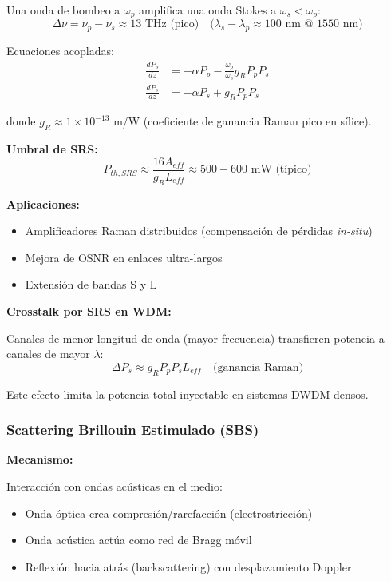 \documentclass[11pt,a4paper]{article}
\begin{document}
Una onda de bombeo a $\omega_p$ amplifica una onda Stokes a $\omega_s < \omega_p$:
\begin{equation}
    \Delta\nu = \nu_p - \nu_s \approx 13 \text{ THz (pico)} \quad (\lambda_s - \lambda_p \approx 100 \text{ nm @ 1550 nm)}
\end{equation}

Ecuaciones acopladas:
\begin{align}
    \frac{dP_p}{dz} &= -\alpha P_p - \frac{\omega_p}{\omega_s}g_R P_p P_s\\
    \frac{dP_s}{dz} &= -\alpha P_s + g_R P_p P_s
\end{align}

donde $g_R \approx 1 \times 10^{-13}$ m/W (coeficiente de ganancia Raman pico en sílice).

\textbf{Umbral de SRS:}
\begin{equation}
    P_{th,SRS} \approx \frac{16 A_{eff}}{g_R L_{eff}} \approx 500-600 \text{ mW (típico)}
\end{equation}

\textbf{Aplicaciones:}
\begin{itemize}
    \item Amplificadores Raman distribuidos (compensación de pérdidas \textit{in-situ})
    \item Mejora de OSNR en enlaces ultra-largos
    \item Extensión de bandas S y L
\end{itemize}

\textbf{Crosstalk por SRS en WDM:}

Canales de menor longitud de onda (mayor frecuencia) transfieren potencia a canales de mayor $\lambda$:
\begin{equation}
    \Delta P_s \approx g_R P_p P_s L_{eff} \quad \text{(ganancia Raman)}
\end{equation}

Este efecto limita la potencia total inyectable en sistemas DWDM densos.

\subsubsection{Scattering Brillouin Estimulado (SBS)}

\textbf{Mecanismo:}

Interacción con ondas acústicas en el medio:
\begin{itemize}
    \item Onda óptica crea compresión/rarefacción (electrostricción)
    \item Onda acústica actúa como red de Bragg móvil
    \item Reflexión hacia atrás (backscattering) con desplazamiento Doppler
\end{itemize}
\end{document}
